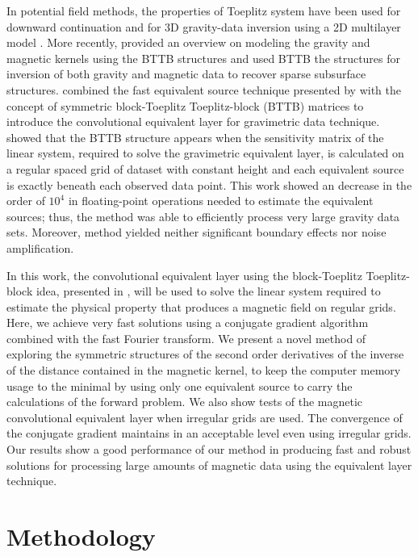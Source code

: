 \documentclass[manuscript]{geophysics}
\begin{document}
In potential field methods, the properties of Toeplitz system have been used for downward continuation \citep{zhang-etal2016} and for 3D gravity-data inversion using a 2D multilayer model \citep{zhang-wong2015}. More recently, \cite{hogue2020tutorial} provided an overview on modeling the gravity and magnetic kernels using the BTTB structures and \cite{renaut2020fast} used BTTB the structures for inversion of both gravity and magnetic data to recover sparse subsurface structures.
\cite{takahashi2020convolutional} combined the fast equivalent source technique presented by \cite{siqueira-etal2017} with the concept of symmetric block-Toeplitz Toeplitz-block (BTTB) matrices to introduce the convolutional equivalent layer for gravimetric data technique. 
\cite{takahashi2020convolutional} showed that the BTTB structure appears when the sensitivity matrix of the linear system, required to solve the gravimetric equivalent layer, is calculated on a regular spaced grid of dataset with constant height and each equivalent source is exactly beneath each observed data point. 
This work showed an decrease in the order of $10^4$ in floating-point operations needed to estimate the equivalent sources; thus, the \cite{takahashi2020convolutional} method was able to efficiently process very large gravity data sets. 
Moreover, \cite{takahashi2020convolutional} method yielded neither significant boundary effects nor noise amplification.

In this work, the convolutional equivalent layer using the block-Toeplitz Toeplitz-block idea, presented in \cite{takahashi2020convolutional}, will be used to solve the linear system required to estimate the physical property that produces a magnetic field on regular grids. 
Here, we achieve very fast solutions using a conjugate gradient algorithm combined with the fast Fourier transform. We present a novel method of exploring the symmetric structures of the second order derivatives of the inverse of the distance contained in the magnetic kernel, to keep the computer memory usage to the minimal by using only one equivalent source to carry the calculations of the forward problem. We also show tests of the magnetic convolutional equivalent layer when irregular grids are used. The convergence of the conjugate gradient maintains in an acceptable level even using irregular grids. 
Our results show a good performance of our method in producing fast and robust solutions for processing large amounts of magnetic data using the equivalent layer technique.


\section{Methodology}
\end{document}
